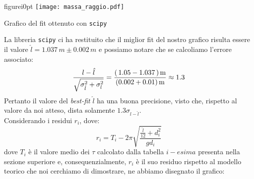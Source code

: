 \documentclass{article}
\begin{document}
\begin{wrapfloat}{figure}{i}{0pt}
	\texttt{[image: massa\_raggio.pdf]}
	\caption{Grafico del fit ottenuto con \texttt{scipy}}
\end{wrapfloat}
La libreria \texttt{scipy} ci ha restituito che il miglior fit del nostro grafico risulta essere il valore $\hat{l} = 1.037 \, m \pm 0.002 \, m$ e possiamo notare che se calcoliamo l'errore associato:
$$
	\frac{l - \hat{l}}{\sqrt{\sigma^2_{\hat{l}} + \sigma^2_{l}}} = \\ \frac{(\, 1.05 - 1.037 \, ) \, \text{m}}{(0.002 + 0.01) \, \text{m}} \approx \\ 1.3
$$
Pertanto il valore del \emph{best-fit} $\hat{l}$ ha una buona precisione, visto che, rispetto al valore da noi atteso, dista solamente $1.3\sigma_{l-\hat{l}}$. \\
Considerando i residui $r_i$, dove:
\begin{equation}
	r_i = T_i - 2\pi\sqrt{\frac{\frac{\hat{l}}{12} + d_i^2}{gd_i}}
\end{equation}
dove $T_i$ è il valore medio dei $\tau$ calcolato dalla tabella $i-esima$ presenta nella sezione superiore e, consequenzialmente, $r_i$ è il suo residuo rispetto al modello teorico che noi cerchiamo di dimostrare, ne abbiamo disegnato il grafico: 
\end{document}
